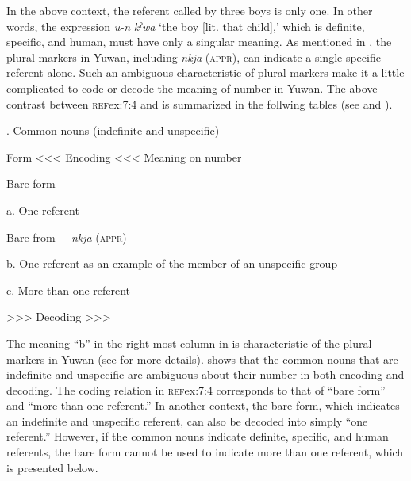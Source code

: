 \z

In the above context, the referent called by three boys is only one. In other words, the expression \textit{u-n} \textit{kˀwa} ‘the boy [lit. that child],’ which is definite, specific, and human, must have only a singular meaning. As mentioned in , the plural markers in Yuwan, including \textit{nkja} (\textsc{appr}), can indicate a single specific referent alone. Such an ambiguous characteristic of plural markers make it a little complicated to code or decode the meaning of number in Yuwan. The above contrast between \textsc{ref}{ex:7:4} and  is summarized in the follwing tables (see  and ).

\begin{table}
\caption{\label{tab:key:45}. Common nouns (indefinite and unspecific)}

Form  <<< Encoding <<<  Meaning on number

Bare form  %


a. One referent

Bare from + \textit{nkja} (\textsc{appr})  %


b. One referent as an example of the member of an unspecific group

c. More than one referent

  >>> Decoding >>>
\end{table}

The meaning “b” in the right-most column in  is characteristic of the plural markers in Yuwan (see  for more details).  shows that the common nouns that are indefinite and unspecific are ambiguous about their number in both encoding and decoding. The coding relation in \textsc{ref}{ex:7:4} corresponds to that of “bare form” and “more than one referent.” In another context, the bare form, which indicates an indefinite and unspecific referent, can also be decoded into simply “one referent.” However, if the common nouns indicate definite, specific, and human referents, the bare form cannot be used to indicate more than one referent, which is presented below.

